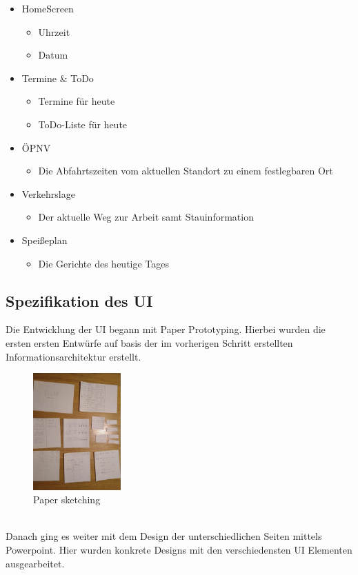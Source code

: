 \documentclass[12pt, a4paper]{scrartcl}
\begin{document}
	\begin{itemize}
		\item HomeScreen
		\begin{itemize}
			\item Uhrzeit
			\item Datum
		\end{itemize}
	\item Termine \& ToDo
	\begin{itemize}
		\item Termine für heute
		\item ToDo-Liste für heute
	\end{itemize}
	\item  ÖPNV
	\begin{itemize}
		\item Die Abfahrtszeiten vom aktuellen Standort zu einem festlegbaren Ort
	\end{itemize}
	\item  Verkehrslage
	\begin{itemize}
		\item Der aktuelle Weg zur Arbeit samt Stauinformation
	\end{itemize}
	\item Speißeplan
	\begin{itemize}
		\item Die Gerichte des heutige Tages
	\end{itemize}
	\end{itemize}
	
	
	\subsection{Spezifikation des UI}
	Die Entwicklung der UI begann mit Paper Prototyping. Hierbei wurden die ersten ersten Entwürfe auf basis der im vorherigen Schritt erstellten Informationsarchitektur erstellt.
	\begin{figure}[h!]
		\centering
		\includegraphics[width = 0.3\textwidth]{img/paperSketching.jpg}
		\captionsetup{labelformat=empty}
		\caption{Paper sketching}
	\end{figure}\\
	Danach ging es weiter mit dem Design der unterschiedlichen Seiten mittels Powerpoint. Hier wurden konkrete Designs mit den verschiedensten UI Elementen ausgearbeitet.
	
\end{document}
